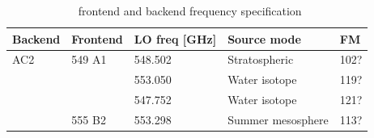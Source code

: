 \begin{table}
\caption{ \smr\ frontend and backend frequency specification}
\label{table:config3}
\begin{tabular}{|l|l|l|l|l|}
  \hline
  \textbf{Backend} & \textbf{Frontend} & \textbf{LO freq {[}GHz{]}} & \textbf{Source mode} & \textbf{FM} \\
  \hline
  AC2              & 549 A1            & 548.502                    & Stratospheric        &  102? \\
  \cline{3-3}
  \cline{4-4}
  \cline{5-5}
                   &                   & 553.050                    & Water isotope        & 119? \\
  \cline{3-3}
  \cline{4-4}
  \cline{5-5}
                   &                   & 547.752                    & Water isotope        & 121? \\
  \cline{2-2}
  \cline{3-3}
  \cline{4-4}
  \cline{5-5}
                   & 555 B2            & 553.298                    & Summer mesosphere    & 113? \\
  \hline
\end{tabular}
\end{table}




